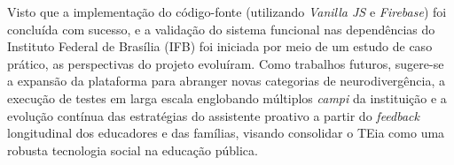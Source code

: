 Visto que a implementação do código-fonte (utilizando \textit{Vanilla JS} e \textit{Firebase}) foi concluída com sucesso, e a validação do sistema funcional nas dependências do Instituto Federal de Brasília (IFB) foi iniciada por meio de um estudo de caso prático, as perspectivas do projeto evoluíram. Como trabalhos futuros, sugere-se a expansão da plataforma para abranger novas categorias de neurodivergência, a execução de testes em larga escala englobando múltiplos \textit{campi} da instituição e a evolução contínua das estratégias do assistente proativo a partir do \textit{feedback} longitudinal dos educadores e das famílias, visando consolidar o TEia como uma robusta tecnologia social na educação pública.